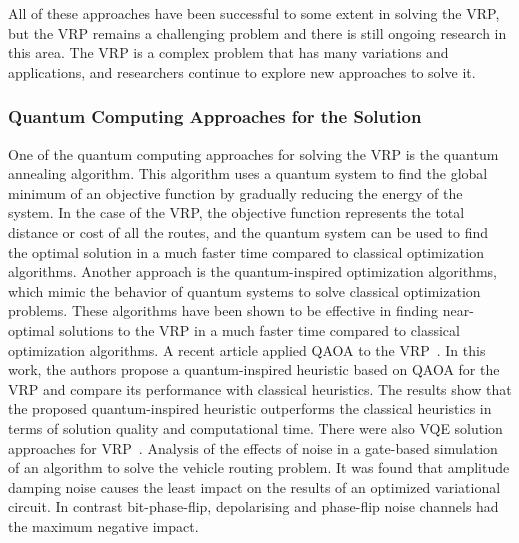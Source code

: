 All of these approaches have been successful to some extent in solving the VRP, but the VRP remains a challenging problem and there is still ongoing research in this area.
The VRP is a complex problem that has many variations and applications, and researchers continue to explore new approaches to solve it.

\subsubsection{Quantum Computing Approaches for the Solution}
One of the quantum computing approaches for solving the VRP is the quantum annealing algorithm.
This algorithm uses a quantum system to find the global minimum of an objective function by gradually reducing the
energy of the system. In the case of the VRP, the objective function represents the total distance or cost of all
the routes, and the quantum system can be used to find the optimal solution in a much faster time compared to classical
optimization algorithms.
Another approach is the quantum-inspired optimization algorithms, which mimic the behavior of quantum systems to solve
classical optimization problems. These algorithms have been shown to be effective in finding near-optimal solutions to
the VRP in a much faster time compared to classical optimization algorithms.
A recent article applied QAOA to the VRP~\cite{9605345}. In this work, the authors propose a quantum-inspired heuristic
based on QAOA for the VRP and
compare its performance with classical heuristics. The results show that the proposed quantum-inspired heuristic
outperforms the classical heuristics in terms of solution quality and computational time.
There were also VQE solution approaches for VRP~\cite{mohanty2022analysis}.
Analysis of the effects of noise in a gate-based
simulation of an algorithm to solve the vehicle routing problem.
It was found that amplitude damping
noise causes the least impact on the results of an optimized
variational circuit. In contrast bit-phase-flip, depolarising and
phase-flip noise channels had the maximum negative impact.



